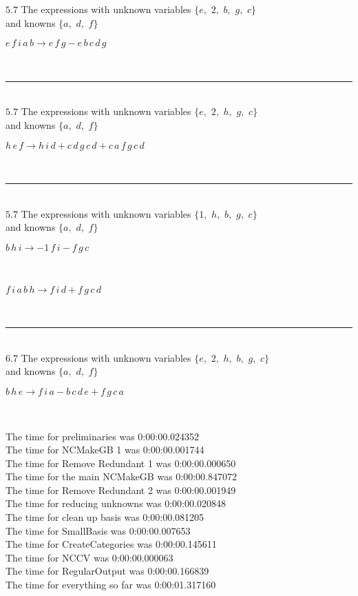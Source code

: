 \documentclass[rep10,leqno]{report}
\begin{document}
$5.7$  The expressions with unknown variables $\{e,
$ $
2,
$ $
b,
$ $
g,
$ $
c\}$\\
and knowns $\{a,
$ $
d,
$ $
f\}$\smallskip\\
\begin{minipage}{6in}
$
e\,
 f\,
 i\,
 a\,
 b\rightarrow e\,
 f\,
 g - e\,
 b\,
 c\,
 d\,
 g
$
\end{minipage}\\
\rule[3pt]{6in}{.7pt}\\
$5.7$  The expressions with unknown variables $\{e,
$ $
2,
$ $
h,
$ $
g,
$ $
c\}$\\
and knowns $\{a,
$ $
d,
$ $
f\}$\smallskip\\
\begin{minipage}{6in}
$
h\,
 e\,
 f\rightarrow h\,
 i\,
 d + c\,
 d\,
 g\,
 c\,
 d + c\,
 a\,
 f\,
 g\,
 c\,
 d
$
\end{minipage}\\
\rule[3pt]{6in}{.7pt}\\
$5.7$  The expressions with unknown variables $\{1,
$ $
h,
$ $
b,
$ $
g,
$ $
c\}$\\
and knowns $\{a,
$ $
d,
$ $
f\}$\smallskip\\
\begin{minipage}{6in}
$
b\,
 h\,
 i\rightarrow -1\,
 f\,
 i - f\,
 g\,
 c
$
\end{minipage}\medskip \\
\begin{minipage}{6in}
$
f\,
 i\,
 a\,
 b\,
 h\rightarrow f\,
 i\,
 d + f\,
 g\,
 c\,
 d
$
\end{minipage}\\
\rule[3pt]{6in}{.7pt}\\
$6.7$  The expressions with unknown variables $\{e,
$ $
2,
$ $
h,
$ $
b,
$ $
g,
$ $
c\}$\\
and knowns $\{a,
$ $
d,
$ $
f\}$\smallskip\\
\begin{minipage}{6in}
$
b\,
 h\,
 e\rightarrow f\,
 i\,
 a - b\,
 c\,
 d\,
 e + f\,
 g\,
 c\,
 a
$
\end{minipage}\\
\vspace{10pt}

\noindent
The time for preliminaries was 0:00:00.024352\\
The time for NCMakeGB 1 was 0:00:00.001744\\
The time for Remove Redundant 1 was 0:00:00.000650\\
The time for the main NCMakeGB was 0:00:00.847072\\
The time for Remove Redundant 2 was 0:00:00.001949\\
The time for reducing unknowns was 0:00:00.020848\\
The time for clean up basis was 0:00:00.081205\\
The time for SmallBasis was 0:00:00.007653\\
The time for CreateCategories was 0:00:00.145611\\
The time for NCCV was 0:00:00.000063\\
The time for RegularOutput was 0:00:00.166839\\
The time for everything so far was 0:00:01.317160\\
\end{document}
